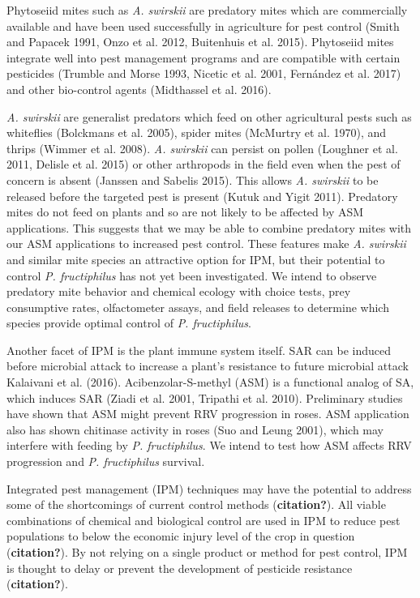 \documentclass[12pt,final,CPage]{ufthesis}
\begin{document}
{  Phytoseiid mites such as \emph{A. swirskii} are predatory mites which are commercially available and have been used successfully in agriculture for pest control (Smith and Papacek 1991, Onzo et al. 2012, Buitenhuis et al. 2015). Phytoseiid mites integrate well into pest management programs and are compatible with certain pesticides (Trumble and Morse 1993, Nicetic et al. 2001, Fernández et al. 2017) and other bio-control agents (Midthassel et al. 2016).

  \emph{A. swirskii} are generalist predators which feed on other agricultural pests such as whiteflies (Bolckmans et al. 2005), spider mites (McMurtry et al. 1970), and thrips (Wimmer et al. 2008). \emph{A. swirskii} can persist on pollen (Loughner et al. 2011, Delisle et al. 2015) or other arthropods in the field even when the pest of concern is absent (Janssen and Sabelis 2015). This allows \emph{A. swirskii} to be released before the targeted pest is present (Kutuk and Yigit 2011). Predatory mites do not feed on plants and so are not likely to be affected by ASM applications. This suggests that we may be able to combine predatory mites with our ASM applications to increased pest control. These features make \emph{A. swirskii} and similar mite species an attractive option for IPM, but their potential to control \emph{P. fructiphilus} has not yet been investigated. We intend to observe predatory mite behavior and chemical ecology with choice tests, prey consumptive rates, olfactometer assays, and field releases to determine which species provide optimal control of \emph{P. fructiphilus}.

  Another facet of IPM is the plant immune system itself. SAR can be induced before microbial attack to increase a plant's resistance to future microbial attack Kalaivani et al. (2016). Acibenzolar-S-methyl (ASM) is a functional analog of SA, which induces SAR (Ziadi et al. 2001, Tripathi et al. 2010). Preliminary studies have shown that ASM might prevent RRV progression in roses. ASM application also has shown chitinase activity in roses (Suo and Leung 2001), which may interfere with feeding by \emph{P. fructiphilus}. We intend to test how ASM affects RRV progression and \emph{P. fructiphilus} survival.

  Integrated pest management (IPM) techniques may have the potential to address some of the shortcomings of current control methods (\textbf{citation?}). All viable combinations of chemical and biological control are used in IPM to reduce pest populations to below the economic injury level of the crop in question (\textbf{citation?}). By not relying on a single product or method for pest control, IPM is thought to delay or prevent the development of pesticide resistance (\textbf{citation?}).

}
\end{document}
